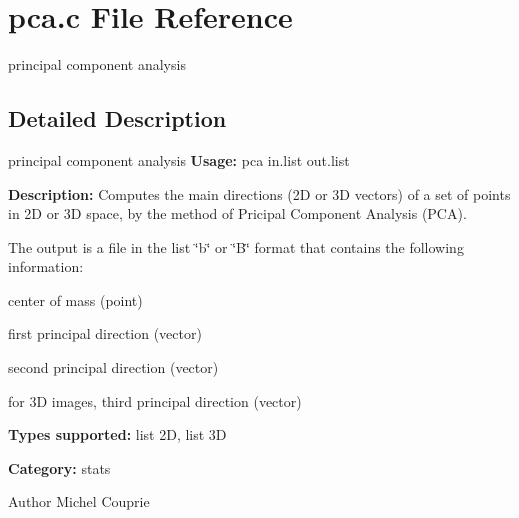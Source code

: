 \section{pca.c File Reference}
\label{pca_8c}


principal component analysis  




\subsection{Detailed Description}
principal component analysis {\bfseries Usage:} pca in.list out.list

{\bfseries Description:} Computes the main directions (2D or 3D vectors) of a set of points in 2D or 3D space, by the method of Pricipal Component Analysis (PCA).

The output is a file in the list \char`\"{}b\char`\"{} or \char`\"{}B\char`\"{} format that contains the following information: \begin{DoxyItemize}
\item center of mass (point) \item first principal direction (vector) \item second principal direction (vector) \item for 3D images, third principal direction (vector)\end{DoxyItemize}
{\bfseries Types supported:} list 2D, list 3D

{\bfseries Category:} stats

\begin{DoxyAuthor}{Author}
Michel Couprie 
\end{DoxyAuthor}
